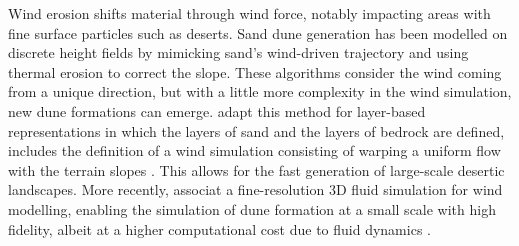 
{}

Wind erosion shifts material through wind force, notably impacting areas with fine surface particles such as deserts.  
Sand dune generation has been modelled on discrete height fields \cite{Roa2004} by mimicking sand's wind-driven trajectory and using thermal erosion to correct the slope. These algorithms consider the wind coming from a unique direction, but with a little more complexity in the wind simulation, new dune formations can emerge.  adapt this method for layer-based representations in which the layers of sand and the layers of bedrock are defined, includes the definition of a wind simulation consisting of warping a uniform flow with the terrain slopes \cite{Paris2019b}. This allows for the fast generation of large-scale desertic landscapes. More recently,  associat a fine-resolution 3D fluid simulation for wind modelling, enabling the simulation of dune formation at a small scale with high fidelity, albeit at a higher computational cost due to fluid dynamics \cite{Rosset2024}.

